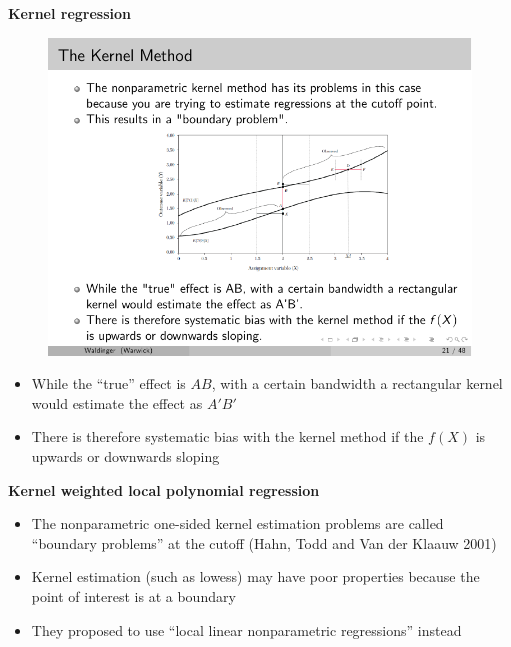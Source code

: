 \documentclass[notes=show]{beamer}
\begin{document}
\begin{frame}[plain]
	\begin{center}
	\textbf{Kernel regression}
	\end{center}
	
		\begin{figure}
		\includegraphics[scale=1.2]{./lecture_includes/kernel_1.pdf}
		\end{figure}
	\begin{itemize}

	\item While the ``true'' effect is $AB$, with a certain bandwidth a rectangular kernel would estimate the effect as $A'B'$
	\item There is therefore systematic bias with the kernel method if the $f(X)$ is upwards or downwards sloping
	\end{itemize}
\end{frame}


\begin{frame}[plain]
	\begin{center}
	\textbf{Kernel weighted local polynomial regression}
	\end{center}
	
	\begin{itemize}
	\item The nonparametric one-sided kernel estimation problems are called ``boundary problems'' at the cutoff (Hahn, Todd and Van der Klaauw 2001)
	\item Kernel estimation (such as lowess) may have poor properties because the point of interest is at a boundary 
	\item They proposed to use ``local linear nonparametric regressions'' instead
	\end{itemize}
	
\end{frame}
\end{document}
